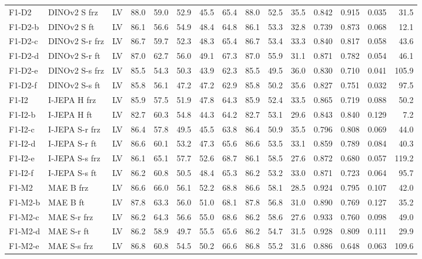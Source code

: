 \begin{longtable}{@{}l>{\raggedright\arraybackslash}p{2.2cm}crrrrrrrrrrrr@{}}
F1-D2 & DINOv2 S frz & LV & 88.0 & 59.0 & 52.9 & 45.5 & 65.4 & 88.0 & 52.5 & 35.5 & 0.842 & 0.915 & 0.035 & 31.5 \\
F1-D2-b & DINOv2 S ft & LV & 86.1 & 56.6 & 54.9 & 48.4 & 64.8 & 86.1 & 53.3 & 32.8 & 0.739 & 0.873 & 0.068 & 12.1 \\
F1-D2-c & DINOv2 S-r frz & LV & 86.7 & 59.7 & 52.3 & 48.3 & 65.4 & 86.7 & 53.4 & 33.3 & 0.840 & 0.817 & 0.058 & 43.6 \\
F1-D2-d & DINOv2 S-r ft & LV & 87.0 & 62.7 & 56.0 & 49.1 & 67.3 & 87.0 & 55.9 & 31.1 & 0.871 & 0.782 & 0.054 & 46.1 \\
F1-D2-e & DINOv2 S-s frz & LV & 85.5 & 54.3 & 50.3 & 43.9 & 62.3 & 85.5 & 49.5 & 36.0 & 0.830 & 0.710 & 0.041 & 105.9 \\
F1-D2-f & DINOv2 S-s ft & LV & 85.8 & 56.1 & 47.2 & 47.2 & 62.9 & 85.8 & 50.2 & 35.6 & 0.827 & 0.751 & 0.032 & 97.5 \\
F1-I2 & I-JEPA H frz & LV & 85.9 & 57.5 & 51.9 & 47.8 & 64.3 & 85.9 & 52.4 & 33.5 & 0.865 & 0.719 & 0.088 & 50.2 \\
F1-I2-b & I-JEPA H ft & LV & 82.7 & 60.3 & 54.8 & 44.3 & 64.2 & 82.7 & 53.1 & 29.6 & 0.843 & 0.840 & 0.129 & 7.2 \\
F1-I2-c & I-JEPA S-r frz & LV & 86.4 & 57.8 & 49.5 & 45.5 & 63.8 & 86.4 & 50.9 & 35.5 & 0.796 & 0.808 & 0.069 & 44.0 \\
F1-I2-d & I-JEPA S-r ft & LV & 86.6 & 60.1 & 53.2 & 47.3 & 65.6 & 86.6 & 53.5 & 33.1 & 0.859 & 0.789 & 0.084 & 40.3 \\
F1-I2-e & I-JEPA S-s frz & LV & 86.1 & 65.1 & 57.7 & 52.6 & 68.7 & 86.1 & 58.5 & 27.6 & 0.872 & 0.680 & 0.057 & 119.2 \\
F1-I2-f & I-JEPA S-s ft & LV & 86.2 & 60.8 & 50.5 & 48.4 & 65.3 & 86.2 & 53.2 & 33.0 & 0.871 & 0.723 & 0.064 & 95.7 \\
F1-M2 & MAE B frz & LV & 86.6 & 66.0 & 56.1 & 52.2 & 68.8 & 86.6 & 58.1 & 28.5 & 0.924 & 0.795 & 0.107 & 42.0 \\
F1-M2-b & MAE B ft & LV & 87.8 & 63.3 & 56.0 & 51.0 & 68.1 & 87.8 & 56.8 & 31.0 & 0.890 & 0.769 & 0.127 & 35.2 \\
F1-M2-c & MAE S-r frz & LV & 86.2 & 64.3 & 56.6 & 55.0 & 68.6 & 86.2 & 58.6 & 27.6 & 0.933 & 0.760 & 0.098 & 49.0 \\
F1-M2-d & MAE S-r ft & LV & 86.2 & 58.9 & 49.7 & 55.5 & 65.6 & 86.2 & 54.7 & 31.5 & 0.928 & 0.809 & 0.111 & 29.9 \\
F1-M2-e & MAE S-s frz & LV & 86.8 & 60.8 & 54.5 & 50.2 & 66.6 & 86.8 & 55.2 & 31.6 & 0.886 & 0.648 & 0.063 & 109.6 \\

\end{longtable}
